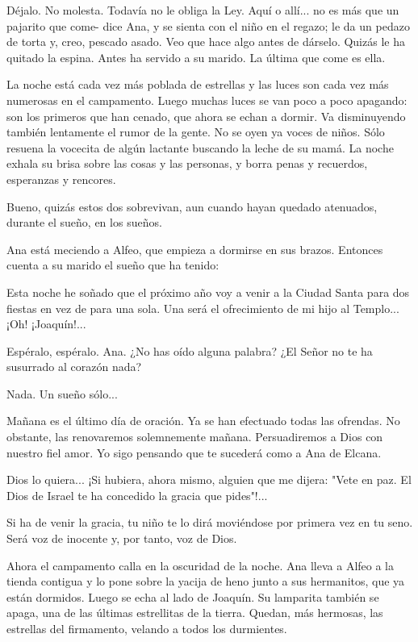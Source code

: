 \documentclass[12pt]{book} %
\begin{document}
Déjalo. No molesta. Todavía no le obliga la Ley. Aquí o allí... no es más que un pajarito que come- dice Ana, y se sienta con el niño en el regazo; le da un pedazo de torta y, creo, pescado asado. Veo que hace algo antes de dárselo. Quizás le ha quitado la espina. Antes ha servido a su marido. La última que come es ella. 

La noche está cada vez más poblada de estrellas y las luces son cada vez más numerosas en el campamento. Luego muchas luces se van poco a poco apagando: son los primeros que han cenado, que ahora se echan a dormir. Va disminuyendo también lentamente el rumor de la gente. No se oyen ya voces de niños. Sólo resuena la vocecita de algún lactante buscando la leche de su mamá. La noche exhala su brisa sobre las cosas y las personas, y borra penas y recuerdos, esperanzas y rencores. 

Bueno, quizás estos dos sobrevivan, aun cuando hayan quedado atenuados, durante el sueño, en los sueños. 

Ana está meciendo a Alfeo, que empieza a dormirse en sus brazos. Entonces cuenta a su marido el sueño que ha tenido: 

Esta noche he soñado que el próximo año voy a venir a la Ciudad Santa para dos fiestas en vez de para una sola. Una será el ofrecimiento de mi hijo al Templo... ¡Oh! ¡Joaquín!...

Espéralo, espéralo. Ana. ¿No has oído alguna palabra? ¿El Señor no te ha susurrado al corazón nada? 

Nada. Un sueño sólo... 

Mañana es el último día de oración. Ya se han efectuado todas las ofrendas. No obstante, las renovaremos solemnemente mañana. Persuadiremos a Dios con nuestro fiel amor. Yo sigo pensando que te sucederá como a Ana de Elcana. 

Dios lo quiera... ¡Si hubiera, ahora mismo, alguien que me dijera: "Vete en paz. El Dios de Israel te ha concedido la gracia que pides"!...

Si ha de venir la gracia, tu niño te lo dirá moviéndose por primera vez en tu seno. Será voz de inocente y, por tanto, voz de Dios. 

Ahora el campamento calla en la oscuridad de la noche. Ana lleva a Alfeo a la tienda contigua y lo pone sobre la yacija de heno junto a sus hermanitos, que ya están dormidos. Luego se echa al lado de Joaquín. Su lamparita también se apaga, una de las últimas estrellitas de la tierra. Quedan, más hermosas, las estrellas del firmamento, velando a todos los durmientes. 
\end{document}
